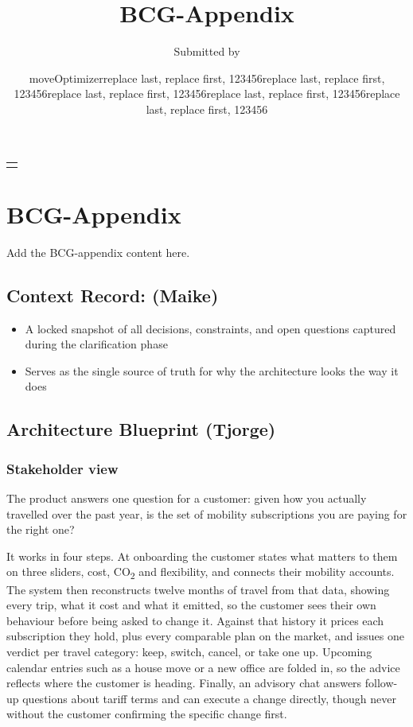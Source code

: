 \documentclass[
  11pt,
  a4paper,
  DIV=11,
  numbers=noendperiod,
  notitlepage]{scrreprt}
\title{BCG-Appendix}
\subtitle{Submitted by}
\author{moveOptimizer\tabularnewline[3pt] replace last, replace first,
123456\tabularnewline[3pt] replace last, replace first,
123456\tabularnewline[3pt] replace last, replace first,
123456\tabularnewline[3pt] replace last, replace first,
123456\tabularnewline[3pt] replace last, replace first, 123456}
\date{}
\makeatletter
\providecommand{\tightlist}{%
  \setlength{\itemsep}{0pt}\setlength{\parskip}{0pt}}
\renewcommand{\tightlist}{%
  \setlength{\itemsep}{2pt}%
  \setlength{\parskip}{0pt}%
}
\renewcommand{\arraystretch}{1.2}
\renewcommand*{\maketitle}{%
  \begingroup
    \setlength{\parindent}{0pt}%
    \setlength{\parskip}{0pt}%
    \renewcommand{\arraystretch}{1}%
    \centering
    {\normalfont\bfseries\fontsize{20pt}{24pt}\selectfont\@title\par}%
    \vspace{10pt}%
    {\normalfont\fontsize{11pt}{13.8pt}\selectfont\@subtitle\par}%
    \vspace{4pt}%
    {\normalfont\bfseries\fontsize{12pt}{13.8pt}\selectfont%
      \begin{tabular}[t]{@{}c@{}}
        \@author
      \end{tabular}\par}%
  \endgroup
}
\makeatother
\begin{document}
\maketitle


\appendix

\chapter{BCG-Appendix}\label{bcg-appendix}

Add the BCG-appendix content here.

\section{Context Record: (Maike)}\label{context-record-maike}

\begin{itemize}
\tightlist
\item
  A locked snapshot of all decisions, constraints, and open questions
  captured during the clarification phase
\item
  Serves as the single source of truth for why the architecture looks
  the way it does
\end{itemize}

\section{Architecture Blueprint
(Tjorge)}\label{architecture-blueprint-tjorge}

\subsection{Stakeholder view}\label{stakeholder-view}

The product answers one question for a customer: given how you actually
travelled over the past year, is the set of mobility subscriptions you
are paying for the right one?

It works in four steps. At onboarding the customer states what matters
to them on three sliders, cost, CO\textsubscript{2} and flexibility, and
connects their mobility accounts. The system then reconstructs twelve
months of travel from that data, showing every trip, what it cost and
what it emitted, so the customer sees their own behaviour before being
asked to change it. Against that history it prices each subscription
they hold, plus every comparable plan on the market, and issues one
verdict per travel category: keep, switch, cancel, or take one up.
Upcoming calendar entries such as a house move or a new office are
folded in, so the advice reflects where the customer is heading.
Finally, an advisory chat answers follow-up questions about tariff terms
and can execute a change directly, though never without the customer
confirming the specific change first.
\end{document}
